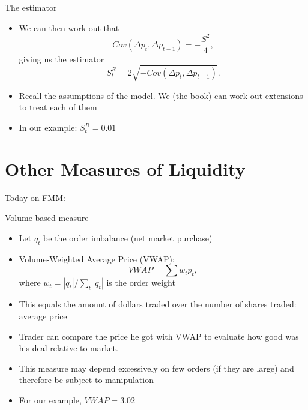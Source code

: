 \documentclass[english,10pt]{beamer}
\begin{document}
\begin{frame}{The estimator}
	\begin{itemize}
		\item We can then work out that
		\[
		Cov(\Delta p_t, \Delta p_{t-1}) = - \frac{S^2}{4},
		\]
		giving us the estimator
		\[
		S^R_t = 2 \sqrt{-Cov(\Delta p_t, \Delta p_{t-1})}.
		\]
		\item Recall the assumptions of the model. We (the book) can work out extensions to treat each of them
		\item In our example: $S^R_t = 0.01$
	\end{itemize}
\end{frame}


\section{Other Measures of Liquidity}

\begin{frame}{Today on FMM:}
	\tableofcontents[currentsection]
\end{frame}


\begin{frame}{Volume based measure}
\begin{itemize}
	\item Let $q_t$ be the order imbalance (net market purchase)
	\item \alert{Volume-Weighted Average Price} (VWAP):
	\[
	VWAP = \sum  w_t p_t,
	\]
	where $w_t = |q_t|/\sum_t |q_t|$ is the order weight
	\item  This equals the amount of dollars traded over the number of shares traded: average price
	\item Trader can compare the price he got with VWAP to evaluate how good was his deal relative to market.
	\item This measure may depend excessively on few orders (if they are large) and therefore be subject to manipulation
	\item For our example, $VWAP=3.02$
\end{itemize}
\end{frame}
\end{document}
